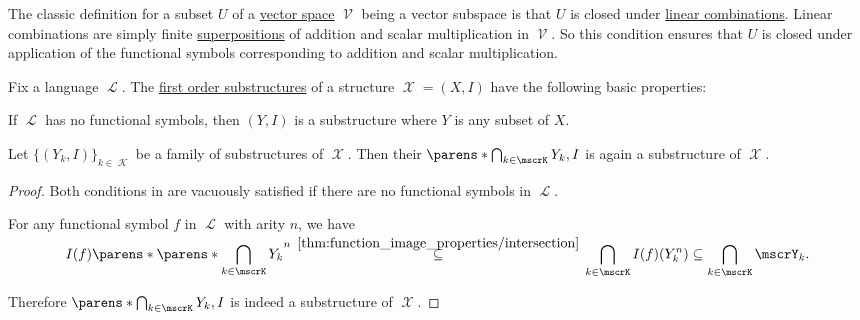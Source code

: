 \begin{example}\label{ex:def:first_order_substructure/vector_space}
  The classic definition for a subset \( U \) of a \hyperref[def:vector_space]{vector space} \( \mscrV \) being a vector subspace is that \( U \) is closed under \hyperref[def:linear_combination]{linear combinations}. Linear combinations are simply finite \hyperref[def:multi_valued_function/superposition]{superpositions} of addition and scalar multiplication in \( \mscrV \). So this condition ensures that \( U \) is closed under application of the functional symbols corresponding to addition and scalar multiplication.
\end{example}

\begin{proposition}\label{thm:first_order_substructure_properties}
  Fix a language \( \mscrL \). The \hyperref[def:first_order_substructure]{first order substructures} of a structure \( \mscrX = (X, I) \) have the following basic properties:
  \begin{thmenum}
     If \( \mscrL \) has no functional symbols, then \( (Y, I) \) is a substructure where \( Y \) is any subset of \( X \).

     Let \( \{ (Y_k, I) \}_{k \in \mscrK} \) be a family of substructures of \( \mscrX \). Then their  \( \parens*{\bigcap_{k \in \mscrK} Y_k, I} \) is again a substructure of \( \mscrX \).
  \end{thmenum}
\end{proposition}
\begin{proof}
   Both conditions in  are vacuously satisfied if there are no functional symbols in \( \mscrL \).

   For any functional symbol \( f \) in \( \mscrL \) with arity \( n \), we have
  \begin{equation*}
    I(f)\parens*{\parens*{\bigcap_{\smash{k \in \mscrK}} Y_k}^n}
    \reloset {\ref{thm:function_image_properties/intersection}} \subseteq
    \bigcap_{k \in \mscrK} I(f)(Y_k^n) \subseteq \bigcap_{k \in \mscrK} \mscrY_k.
  \end{equation*}

  Therefore \( \parens*{\bigcap_{k \in \mscrK} Y_k, I} \) is indeed a substructure of \( \mscrX \).
\end{proof}

